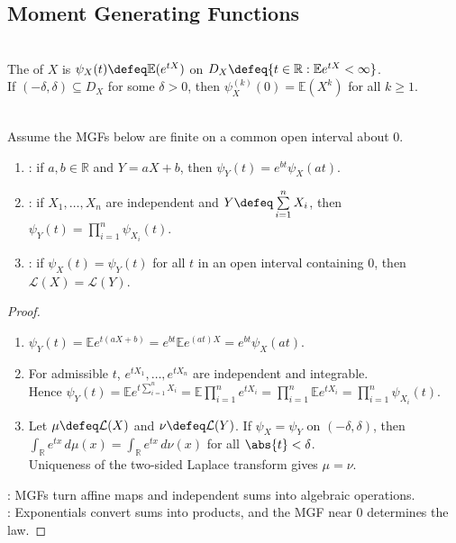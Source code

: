 \subsection{Moment Generating Functions}
\begin{definition} \label{def:moment-generating-function} \\
The  of $X$ is $\psi_X(t)\defeq\mathbb{E}(e^{tX})$ on $D_X\defeq\{t\in\mathbb{R}:\mathbb{E}e^{tX}<\infty\}$.\\
If $(-\delta,\delta)\subseteq D_X$ for some $\delta>0$, then $\psi_X^{(k)}(0)=\mathbb{E}(X^k)$ for all $k\geq1$.
\end{definition}

\begin{proposition} \label{prop:mgf-basic-properties} \\
Assume the MGFs below are finite on a common open interval about $0$.
\begin{enumerate}[label=(\roman*)]
\setlength{\itemsep}{0pt}
\item {}: if $a,b\in\mathbb{R}$ and $Y=aX+b$, then $\psi_Y(t)=e^{bt}\psi_X(at)$.
\item {}: if $X_1,\ldots,X_n$ are independent and $Y\defeq\sum\limits_{i=1}^{n}X_i$, then $\psi_Y(t)=\prod\limits_{i=1}^{n}\psi_{X_i}(t)$.
\item {}: if $\psi_X(t)=\psi_Y(t)$ for all $t$ in an open interval containing $0$, then $\mathcal{L}(X)=\mathcal{L}(Y)$.
\end{enumerate}
\begin{proof}
\begin{enumerate}[label=(\roman*)]
\setlength{\itemsep}{0pt}
\item $\psi_Y(t)=\mathbb{E}e^{t(aX+b)}=e^{bt}\mathbb{E}e^{(at)X}=e^{bt}\psi_X(at)$.
\item For admissible $t$, $e^{tX_1},\ldots,e^{tX_n}$ are independent and integrable.\\
Hence $\psi_Y(t)=\mathbb{E}e^{t\sum\limits_{i=1}^{n}X_i}=\mathbb{E}\prod\limits_{i=1}^{n}e^{tX_i}=\prod\limits_{i=1}^{n}\mathbb{E}e^{tX_i}=\prod\limits_{i=1}^{n}\psi_{X_i}(t)$.
\item Let $\mu\defeq\mathcal{L}(X)$ and $\nu\defeq\mathcal{L}(Y)$. If $\psi_X=\psi_Y$ on $(-\delta,\delta)$, then $\int_{\mathbb{R}}e^{tx}\,d\mu(x)=\int_{\mathbb{R}}e^{tx}\,d\nu(x)$ for all $\abs{t}<\delta$.\\
Uniqueness of the two-sided Laplace transform gives $\mu=\nu$.
\end{enumerate}
: MGFs turn affine maps and independent sums into algebraic operations.\\
: Exponentials convert sums into products, and the MGF near $0$ determines the law.
\end{proof}
\end{proposition}

